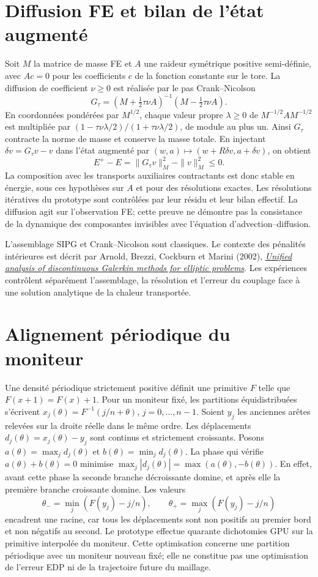 \documentclass[11pt,a4paper]{article}
\begin{document}
\section{Diffusion FE et bilan de l'état augmenté}
Soit $M$ la matrice de masse FE et $A$ une raideur symétrique positive
semi-définie, avec $Ac=0$ pour les coefficients $c$ de la fonction
constante sur le tore. La diffusion de coefficient
$\nu\geq0$ est réalisée par le pas Crank--Nicolson
\[
 G_\tau=(M+\tfrac12\tau\nu A)^{-1}
              (M-\tfrac12\tau\nu A).
\]
En coordonnées pondérées par $M^{1/2}$, chaque valeur propre
$\lambda\geq0$ de $M^{-1/2}AM^{-1/2}$ est multipliée par
$(1-\tau\nu\lambda/2)/(1+\tau\nu\lambda/2)$, de module au plus un.
Ainsi $G_\tau$ contracte la norme de masse et conserve la masse totale.
En injectant $\delta v=G_\tau v-v$ dans l'état augmenté par
$(w,a)\mapsto(w+R\delta v,a+\delta v)$, on obtient
\[
 E^+-E=\|G_\tau v\|_M^2-\|v\|_M^2\leq0.
\]
La composition avec les transports auxiliaires contractants est donc
stable en énergie, sous ces hypothèses sur $A$ et pour des résolutions
exactes. Les résolutions itératives du prototype sont contrôlées par
leur résidu et leur bilan effectif. La diffusion agit sur l'observation
FE; cette preuve ne démontre pas la consistance de la dynamique des
composantes invisibles avec l'équation d'advection--diffusion.

L'assemblage SIPG et Crank--Nicolson sont classiques. Le contexte des
pénalités intérieures est décrit par Arnold, Brezzi, Cockburn et Marini
(2002),
\href{https://www-users.cse.umn.edu/~arnold/papers/dgerr.pdf}{\emph{Unified analysis of discontinuous Galerkin methods for elliptic problems}}.
Les expériences contrôlent séparément l'assemblage, la résolution
et l'erreur du couplage face à une solution analytique de la chaleur
transportée.

\section{Alignement périodique du moniteur}
Une densité périodique strictement positive définit une primitive
$F$ telle que $F(x+1)=F(x)+1$. Pour un moniteur fixé, les partitions
équidistribuées s'écrivent
$x_j(\theta)=F^{-1}(j/n+\theta)$, $j=0,\ldots,n-1$.
Soient $y_j$ les anciennes arêtes relevées sur la droite réelle dans
le même ordre. Les déplacements $d_j(\theta)=x_j(\theta)-y_j$
sont continus et strictement croissants. Posons
$a(\theta)=\max_j d_j(\theta)$ et $b(\theta)=\min_j d_j(\theta)$.
La phase qui vérifie $a(\theta)+b(\theta)=0$ minimise
$\max_j|d_j(\theta)|=\max(a(\theta),-b(\theta))$.
En effet, avant cette phase la seconde branche décroissante domine,
et après elle la première branche croissante domine.
Les valeurs
\[
 \theta_- = \min_j(F(y_j)-j/n),\qquad
 \theta_+ = \max_j(F(y_j)-j/n)
\]
encadrent une racine, car tous les déplacements sont non positifs au
premier bord et non négatifs au second. Le prototype effectue quarante
dichotomies GPU sur la primitive interpolée du moniteur.
Cette optimisation concerne une partition périodique avec un moniteur
nouveau fixé; elle ne constitue pas une optimisation de l'erreur EDP
ni de la trajectoire future du maillage.
\end{document}
